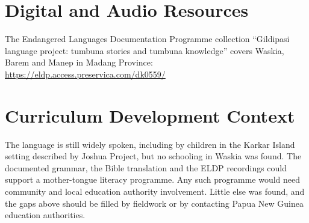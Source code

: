 \documentclass[12pt]{article}
\begin{document}
\section{Digital and Audio Resources}
The Endangered Languages Documentation Programme collection ``Gildipasi language project: tumbuna stories and tumbuna knowledge'' covers Waskia, Barem and Manep in Madang Province: \url{https://eldp.access.preservica.com/dk0559/}

\section{Curriculum Development Context}
The language is still widely spoken, including by children in the Karkar Island setting described by Joshua Project, but no schooling in Waskia was found. The documented grammar, the Bible translation and the ELDP recordings could support a mother-tongue literacy programme. Any such programme would need community and local education authority involvement. Little else was found, and the gaps above should be filled by fieldwork or by contacting Papua New Guinea education authorities.
\end{document}
